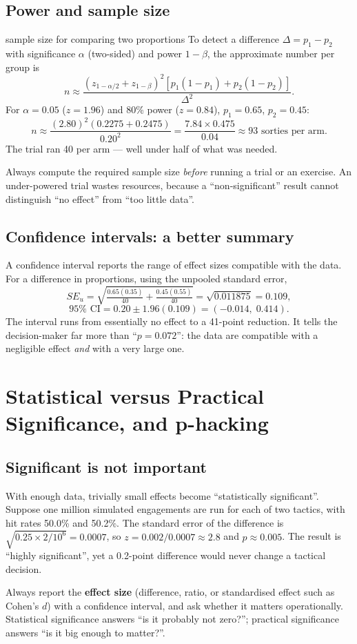 \documentclass[11pt]{article}
\begin{document}
\subsection{Power and sample size}
\begin{derivation}{sample size for comparing two proportions}
To detect a difference $\Delta=p_1-p_2$ with significance $\alpha$ (two-sided) and power $1-\beta$, the approximate number per group is
\[n\approx\frac{\left(z_{1-\alpha/2}+z_{1-\beta}\right)^2\left[p_1(1-p_1)+p_2(1-p_2)\right]}{\Delta^2}.\]
For $\alpha=0.05$ ($z=1.96$) and 80\% power ($z=0.84$), $p_1=0.65$, $p_2=0.45$:
\[n\approx\frac{(2.80)^2(0.2275+0.2475)}{0.20^2}=\frac{7.84\times0.475}{0.04}\approx93\text{ sorties per arm.}\]
The trial ran 40 per arm --- well under half of what was needed.
\end{derivation}

\begin{keypoint}Always compute the required sample size \emph{before} running a trial or an exercise. An under-powered trial wastes resources, because a ``non-significant'' result cannot distinguish ``no effect'' from ``too little data''.\end{keypoint}

\subsection{Confidence intervals: a better summary}
A confidence interval reports the range of effect sizes compatible with the data. For a difference in proportions, using the unpooled standard error,
\[SE_u=\sqrt{\tfrac{0.65(0.35)}{40}+\tfrac{0.45(0.55)}{40}}=\sqrt{0.011875}=0.109,\]\[95\%\text{ CI}=0.20\pm1.96(0.109)=(-0.014,\;0.414).\]
The interval runs from essentially no effect to a 41-point reduction. It tells the decision-maker far more than ``$p=0.072$'': the data are compatible with a negligible effect \emph{and} with a very large one.

\section{Statistical versus Practical Significance, and p-hacking}
\subsection{Significant is not important}
With enough data, trivially small effects become ``statistically significant''. Suppose one million simulated engagements are run for each of two tactics, with hit rates 50.0\% and 50.2\%. The standard error of the difference is $\sqrt{0.25\times2/10^6}=0.0007$, so $z=0.002/0.0007\approx2.8$ and $p\approx0.005$. The result is ``highly significant'', yet a 0.2-point difference would never change a tactical decision.
\begin{keypoint}Always report the \textbf{effect size} (difference, ratio, or standardised effect such as Cohen's $d$) with a confidence interval, and ask whether it matters operationally. Statistical significance answers ``is it probably not zero?''; practical significance answers ``is it big enough to matter?''.\end{keypoint}
\end{document}
